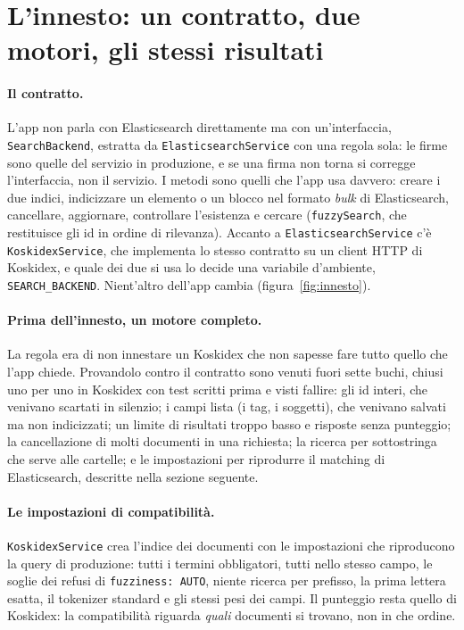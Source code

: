 \section{L'innesto: un contratto, due motori, gli stessi risultati}\label{sec:innesto}

\paragraph{Il contratto.} L'app non parla con Elasticsearch direttamente ma con
un'interfaccia, \texttt{SearchBackend}, estratta da \texttt{ElasticsearchService}
con una regola sola: le firme sono quelle del servizio in produzione, e se una
firma non torna si corregge l'interfaccia, non il servizio. I metodi sono quelli
che l'app usa davvero: creare i due indici, indicizzare un elemento o un blocco
nel formato \emph{bulk} di Elasticsearch, cancellare, aggiornare, controllare
l'esistenza e cercare (\texttt{fuzzySearch}, che restituisce gli id in ordine di
rilevanza). Accanto a \texttt{ElasticsearchService} c'è \texttt{KoskidexService},
che implementa lo stesso contratto su un client HTTP di Koskidex, e quale dei due
si usa lo decide una variabile d'ambiente, \texttt{SEARCH\_BACKEND}. Nient'altro
dell'app cambia (figura~\ref{fig:innesto}).



\paragraph{Prima dell'innesto, un motore completo.} La regola era di non
innestare un Koskidex che non sapesse fare tutto quello che l'app chiede.
Provandolo contro il contratto sono venuti fuori sette buchi, chiusi uno per uno
in Koskidex con test scritti prima e visti fallire: gli id interi, che venivano
scartati in silenzio; i campi lista (i tag, i soggetti), che venivano salvati ma
non indicizzati; un limite di risultati troppo basso e risposte senza punteggio;
la cancellazione di molti documenti in una richiesta; la ricerca per
sottostringa che serve alle cartelle; e le impostazioni per riprodurre il
matching di Elasticsearch, descritte nella sezione seguente.

\paragraph{Le impostazioni di compatibilità.} \texttt{KoskidexService} crea
l'indice dei documenti con le impostazioni che riproducono la query di
produzione: tutti i termini obbligatori, tutti nello stesso campo, le soglie dei
refusi di \texttt{fuzziness: AUTO}, niente ricerca per prefisso, la prima lettera
esatta, il tokenizer standard e gli stessi pesi dei campi. Il punteggio resta
quello di Koskidex: la compatibilità riguarda \emph{quali} documenti si trovano,
non in che ordine.

